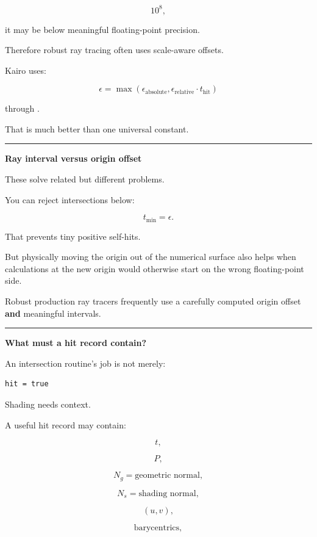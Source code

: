 \[
10^8,
\]

it may be below meaningful floating-point precision.

Therefore robust ray tracing often uses scale-aware offsets.

Kairo uses:

\[
\boxed{
\epsilon=
\max(
\epsilon_{\text{absolute}},
\epsilon_{\text{relative}}\cdot t_{\text{hit}}
)
}
\]

through .

That is much better than one universal constant.

\begin{center}\rule{0.5\linewidth}{0.5pt}\end{center}

\textbf{Ray interval versus origin offset}

These solve related but different problems.

You can reject intersections below:

\[
t_{\min}=\epsilon.
\]

That prevents tiny positive self-hits.

But physically moving the origin out of the numerical surface also helps when calculations at the new origin would otherwise start on the wrong floating-point side.

Robust production ray tracers frequently use a carefully computed origin offset \textbf{and} meaningful intervals.

\begin{center}\rule{0.5\linewidth}{0.5pt}\end{center}

\textbf{What must a hit record contain?}

An intersection routine's job is not merely:

\begin{verbatim}
hit = true
\end{verbatim}

Shading needs context.

A useful hit record may contain:

\[
t,
\]

\[
P,
\]

\[
N_g=\text{geometric normal},
\]

\[
N_s=\text{shading normal},
\]

\[
(u,v),
\]

\[
\text{barycentrics},
\]

